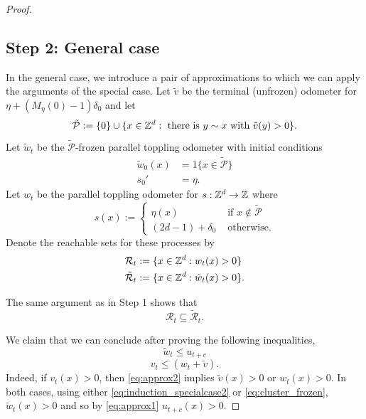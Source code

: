 \documentclass[12pt]{amsart}
\begin{document}
\begin{proof}
	\subsection*{Step 2: General case}
	In the general case, we introduce a pair of approximations to which we can apply the arguments of the special case. Let $\tilde{v}$ be the terminal (unfrozen) odometer for $\eta + (M_{\eta}(0)-1)  \delta_0$ and let
	\begin{equation} \label{eq:penultimate_touched}
	\tilde{\mathcal{P}} := \{0\} \cup \{ x \in \mathbb{Z}^d : \mbox{ there is $y \sim x$ with $\tilde{v}(y) > 0 $}\}.
	\end{equation}
	Let $\tilde{w}_t$ be the $\tilde{\mathcal{P}}$-frozen parallel toppling odometer with initial conditions  
	\begin{equation} \label{eq:cluster_frozen}
	\begin{aligned}
	\tilde{w}_0(x) &= 1 \{ x \in \tilde{\mathcal{P}} \} \\
	s_0' &= \eta.
	\end{aligned}
	\end{equation}
	Let $w_t$ be the parallel toppling odometer for $s: \mathbb{Z}^d \to \mathbb{Z}$ where 
	\begin{equation}
	s(x) := 
	\begin{cases}
	\eta(x) &\mbox{ if $x \not \in \tilde{\mathcal{P}}$}  \\
	(2 d - 1) + \delta_0  &\mbox{ otherwise}.
	\end{cases}
	\end{equation}
	Denote the reachable sets for these processes by
	\begin{equation}
	\begin{aligned} 
	\mathcal{R}_t &:= \{ x \in \mathbb{Z}^d : w_t(x) > 0 \} \\
	\tilde{\mathcal{R}}_t &:= \{x \in \mathbb{Z}^d : \tilde{w}_t(x) > 0\}.
	\end{aligned}
	\end{equation}
	
	The same argument as in Step 1 shows that
	\begin{equation} \label{eq:induction_specialcase2}
	\mathcal{R}_t \subseteq \tilde{\mathcal{R}}_t.
	\end{equation}
	
	We claim that we can conclude after proving the following inequalities, 
	\begin{equation} \label{eq:approx1}
	\tilde{w}_t \leq u_{t + c}
	\end{equation}
	\begin{equation} \label{eq:approx2}
	v_{t} \leq \left( w_{t} + \tilde{v}\right).
	\end{equation}
	Indeed, if $v_t(x) > 0$, then \eqref{eq:approx2} implies $\tilde{v}(x) > 0$ or $w_{t}(x) > 0$. In both cases, 
	using either \eqref{eq:induction_specialcase2} or \eqref{eq:cluster_frozen},
	$\tilde{w}_t(x) > 0$ and so by \eqref{eq:approx1} $u_{t+c}(x) > 0$.
	

\end{proof}
\end{document}
